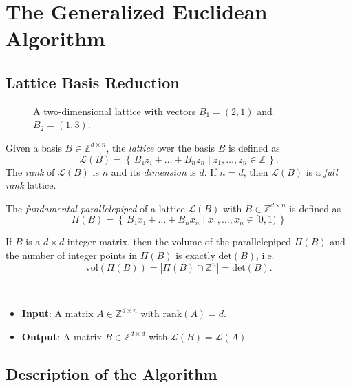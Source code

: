 \chapter{The Generalized Euclidean Algorithm}

\section{Lattice Basis Reduction}

\begin{figure}[b]
  \centering
  
  \caption{A two-dimensional lattice with vectors $B_1 = (2, 1)$ and $B_2 = (1, 3)$.}
\end{figure}

\begin{definition}
  Given a basis $B ∈ ℤ^{d × n}$, the \emph{lattice} over the basis $B$ is defined as
  \[
    \mathcal{L}(B) = \left\{\, B₁z₁ + \dots + B_n z_n \mid z_1, \dots, z_n ∈ ℤ \,\right\}.
  \]
  The \emph{rank} of $\mathcal{L}(B)$ is $n$ and its \emph{dimension} is $d$.
  If $n = d$, then $\mathcal{L}(B)$ is a \emph{full rank} lattice.
\end{definition}

\begin{definition}
  The \emph{fundamental parallelepiped} of a lattice $\mathcal{L}(B)$ with $B ∈ ℤ^{d × n}$ is defined as
  \[
    Π(B) = \left\{\, B₁ x₁ + \dots + B_n x_n \mid x_1, \dots, x_n ∈ [0, 1) \,\right\}
  \]
\end{definition}

If $B$ is a $d × d$ integer matrix,
then the volume of the parallelepiped $Π(B)$ and the number of integer points
in $Π(B)$ is exactly $\mathrm{det}(B)$, i.e.
\[
  \text{vol}(Π(B)) = |Π(B) ∩ ℤ^n| = \mathrm{det}(B).
\]

\begin{problem}~
  \begin{itemize}
    \item \textbf{Input}: A matrix $A ∈ ℤ^{d × n}$ with $\text{rank}(A) = d$.
    \item \textbf{Output}: A matrix $B ∈ ℤ^{d × d}$ with $\mathcal{L}(B) = \mathcal{L}(A)$.
  \end{itemize}
\end{problem}

\section{Description of the Algorithm}

